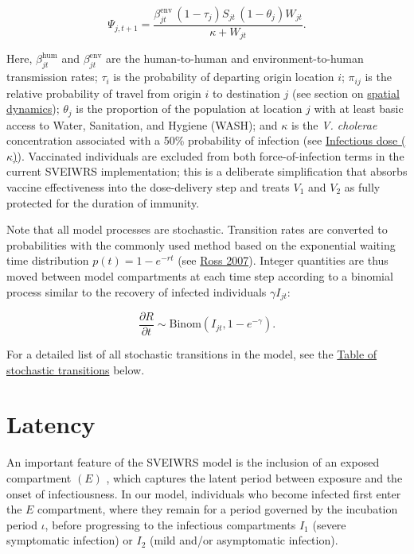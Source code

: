 \documentclass[
]{book}
\begin{document}
\begin{equation}
\Psi_{j,t+1} = \frac{\beta_{jt}^{\text{env}}\, (1-\tau_{j})S_{jt}\,(1-\theta_j)W_{jt}}{\kappa + W_{jt}}.
\label{eq:foi-environment}
\end{equation}

Here, \(\beta_{jt}^{\text{hum}}\) and \(\beta_{jt}^{\text{env}}\) are the human-to-human and environment-to-human transmission rates; \(\tau_i\) is the probability of departing origin location \(i\); \(\pi_{ij}\) is the relative probability of travel from origin \(i\) to destination \(j\) (see section on \hyperref[spatial-dynamics]{spatial dynamics}); \(\theta_j\) is the proportion of the population at location \(j\) with at least basic access to Water, Sanitation, and Hygiene (WASH); and \(\kappa\) is the \emph{V. cholerae} concentration associated with a 50\% probability of infection (see \hyperref[infectious-dose-kappa]{Infectious dose (\(\kappa\))}). Vaccinated individuals are excluded from both force-of-infection terms in the current SVEIWRS implementation; this is a deliberate simplification that absorbs vaccine effectiveness into the dose-delivery step and treats \(V_1\) and \(V_2\) as fully protected for the duration of immunity.

Note that all model processes are stochastic. Transition rates are converted to probabilities with the commonly used method based on the exponential waiting time distribution \(p(t) = 1-e^{-rt}\) (see \href{https://www.google.com/books/edition/Introduction_to_Probability_Models/1uxBwhAb_zYC?hl=en}{Ross 2007}). Integer quantities are thus moved between model compartments at each time step according to a binomial process similar to the recovery of infected individuals \(\gamma I_{jt}\):

\begin{equation}
\frac{\partial R}{\partial t} \sim \text{Binom}(I_{jt}, 1-e^{-\gamma}).
\end{equation}

For a detailed list of all stochastic transitions in the model, see the \hyperref[transitions-table]{Table of stochastic transitions} below.

\section{Latency}\label{latency}

An important feature of the SVEIWRS model is the inclusion of an exposed compartment \(\left(E\right)\) , which captures the latent period between exposure and the onset of infectiousness. In our model, individuals who become infected first enter the \(E\) compartment, where they remain for a period governed by the incubation period \(\iota\), before progressing to the infectious compartments \(I_1\) (severe symptomatic infection) or \(I_2\) (mild and/or asymptomatic infection).
\end{document}
